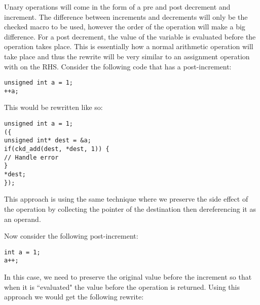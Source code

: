 Unary operations will come in the form of a pre and post decrement and increment. The difference between increments and decrements will only be the checked macro to be used, however the order of the operation will make a big difference. For a post decrement, the value of the variable is evaluated before the operation takes place. This is essentially how a normal arithmetic operation will take place and thus the rewrite will be very similar to an assignment operation with on the RHS. Consider the following code that has a post-increment:

\begin{center}
\parbox{0.6\linewidth}{
\texttt{unsigned int a = 1;\\
++a;}
}
\end{center}

This would be rewritten like so:
\begin{center}
\parbox{0.8\linewidth}{
\texttt{unsigned int a = 1;\\
(\{\\
\hspace*{2em}unsigned int* dest = \&a;\\
\hspace*{2em}if(ckd\_add(dest, *dest, 1)) \{\\
\hspace*{4em}// Handle error\\
\hspace*{2em}\}\\
\hspace*{2em}*dest;\\
\});}
}
\end{center}

This approach is using the same technique where we preserve the side effect of the operation by collecting the pointer of the destination then dereferencing it as an operand.

Now consider the following post-increment:
\begin{center}
\parbox{0.6\linewidth}{
\texttt{int a = 1;\\
a++;}
}
\end{center}

In this case, we need to preserve the original value before the increment so that when it is ``evaluated" the value before the operation is returned. Using this approach we would get the following rewrite:

